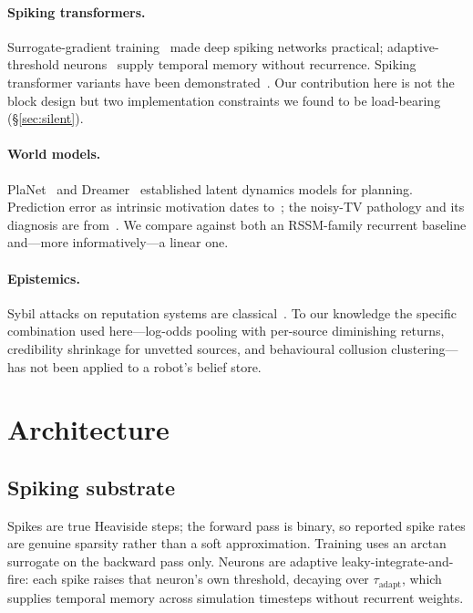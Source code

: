 \documentclass[10pt,twocolumn]{article}
\begin{document}
\paragraph{Spiking transformers.} Surrogate-gradient training~\cite{neftci2019}
made deep spiking networks practical; adaptive-threshold neurons~\cite{bellec2018}
supply temporal memory without recurrence. Spiking transformer variants have
been demonstrated~\cite{zhou2023}. Our contribution here is not the block
design but two implementation constraints we found to be load-bearing
(\S\ref{sec:silent}).

\paragraph{World models.} PlaNet~\cite{hafner2019} and Dreamer~\cite{hafner2020}
established latent dynamics models for planning. Prediction error as intrinsic
motivation dates to~\cite{pathak2017}; the noisy-TV pathology and its
diagnosis are from~\cite{burda2019}. We compare against both an RSSM-family
recurrent baseline and---more informatively---a linear one.

\paragraph{Epistemics.} Sybil attacks on reputation systems are
classical~\cite{douceur2002}. To our knowledge the specific combination used
here---log-odds pooling with per-source diminishing returns, credibility
shrinkage for unvetted sources, and behavioural collusion clustering---has not
been applied to a robot's belief store.

\section{Architecture}
\label{sec:arch}

\subsection{Spiking substrate}

Spikes are true Heaviside steps; the forward pass is binary, so reported spike
rates are genuine sparsity rather than a soft approximation. Training uses an
arctan surrogate on the backward pass only. Neurons are adaptive
leaky-integrate-and-fire: each spike raises that neuron's own threshold, decaying
over $\tau_{\text{adapt}}$, which supplies temporal memory across simulation
timesteps without recurrent weights.
\end{document}
